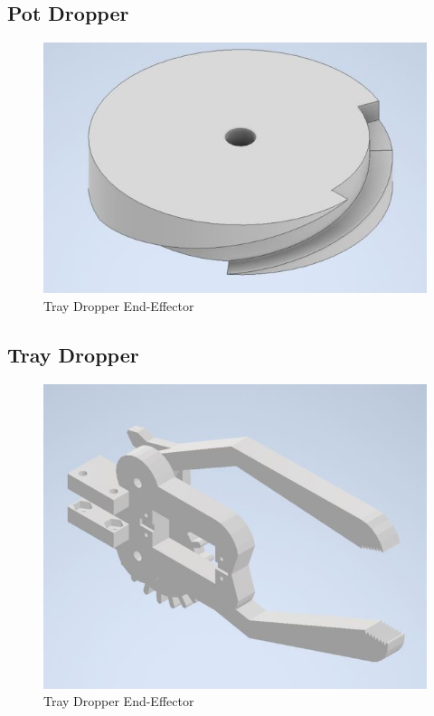 \documentclass[12pt, titlepage]{article}
\begin{document}
\subsection{Pot Dropper}
\begin{figure}[H]
  \centering
  \includegraphics{Pot_Dropper.jpg}
  \caption{Tray Dropper End-Effector}
  \label{fig:potdropper1}
\end{figure}

\subsection{Tray Dropper}
\begin{figure}[H]
  \centering
  \includegraphics{Tray_Dropper.jpg}
  \caption{Tray Dropper End-Effector}
  \label{fig:traydropper1}
\end{figure}
\end{document}
